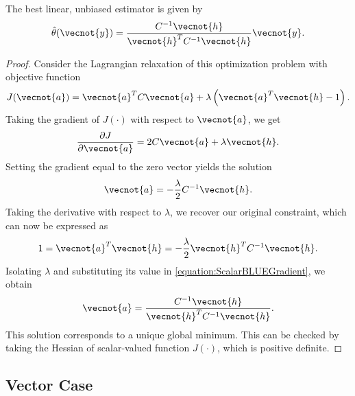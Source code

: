 \begin{theorem}
The best linear, unbiased estimator is given by
\begin{equation*}
\hat{\theta} (\vecnot{y}) = \frac{C^{-1} \vecnot{h}}{\vecnot{h}^T C^{-1} \vecnot{h}} \vecnot{y} .
\end{equation*}
\end{theorem}
\begin{proof}
Consider the Lagrangian relaxation of this optimization problem with objective function
\begin{equation*}
J (\vecnot{a}) =
\vecnot{a}^T C \vecnot{a} + \lambda \left( \vecnot{a}^T \vecnot{h} - 1 \right) .
\end{equation*}
Taking the gradient of $J(\cdot)$ with respect to $\vecnot{a}$, we get
\begin{equation*}
\frac{\partial J}{\partial \vecnot{a}} = 2 C \vecnot{a} + \lambda \vecnot{h} .
\end{equation*}
Setting the gradient equal to the zero vector yields the solution
\begin{equation} \label{equation:ScalarBLUEGradient}
\vecnot{a} = - \frac{\lambda}{2} C^{-1} \vecnot{h} .
\end{equation}
Taking the derivative with respect to $\lambda$, we recover our original constraint, which can now be expressed as
\begin{equation*}
1 = \vecnot{a}^T \vecnot{h} = - \frac{\lambda}{2} \vecnot{h}^T C^{-1} \vecnot{h} .
\end{equation*}
Isolating $\lambda$ and substituting its value in \eqref{equation:ScalarBLUEGradient}, we obtain
\begin{equation}
\vecnot{a} = \frac{C^{-1} \vecnot{h}}{\vecnot{h}^T C^{-1} \vecnot{h}} .
\end{equation}
This solution corresponds to a unique global minimum.
This can be checked by taking the Hessian of scalar-valued function $J(\cdot)$, which is positive definite.
\end{proof}


\subsection{Vector Case}

